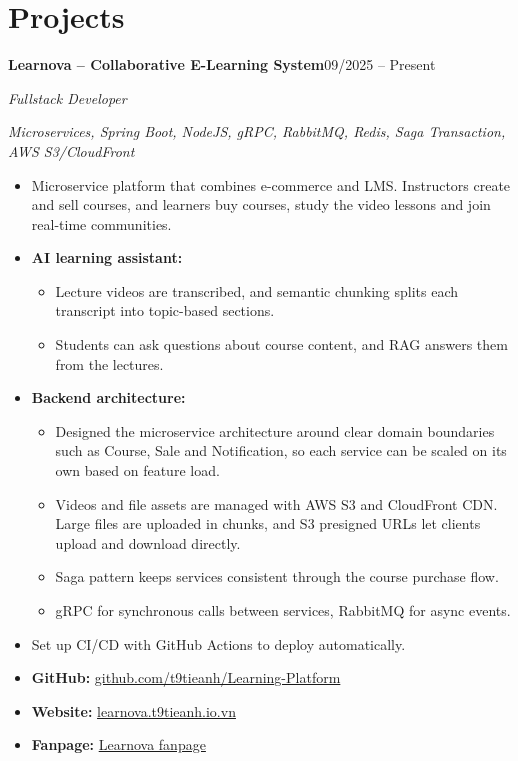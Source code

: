 \documentclass[11pt,a4paper]{article}
\newcommand{\entry}[3]{%
  \textbf{#1}\hfill #2\par\vspace{3pt}
  {\itshape\color{subtle}#3}\par\vspace{1pt}}
\begin{document}
\section{Projects}
\entry{Learnova -- Collaborative E-Learning System}{09/2025 -- Present}{Fullstack Developer}
{\small\textit{Microservices, Spring Boot, NodeJS, gRPC, RabbitMQ, Redis, Saga Transaction, AWS S3/CloudFront}}\par
\begin{itemize}
  \item Microservice platform that combines e-commerce and LMS. Instructors create and sell courses, and learners buy courses, study the video lessons and join real-time communities.
  \item \textbf{AI learning assistant:}
  \begin{itemize}
    \item Lecture videos are transcribed, and semantic chunking splits each transcript into topic-based sections.
    \item Students can ask questions about course content, and RAG answers them from the lectures.
  \end{itemize}
  \item \textbf{Backend architecture:}
  \begin{itemize}
    \item Designed the microservice architecture around clear domain boundaries such as Course, Sale and Notification, so each service can be scaled on its own based on feature load.
    \item Videos and file assets are managed with AWS S3 and CloudFront CDN. Large files are uploaded in chunks, and S3 presigned URLs let clients upload and download directly.
    \item Saga pattern keeps services consistent through the course purchase flow.
    \item gRPC for synchronous calls between services, RabbitMQ for async events.
  \end{itemize}
  \item Set up CI/CD with GitHub Actions to deploy automatically.
  \item \textbf{GitHub:} \href{https://github.com/t9tieanh/Learning-Platform}{github.com/t9tieanh/Learning-Platform}
  \item \textbf{Website:} \href{https://learnova.t9tieanh.io.vn/}{learnova.t9tieanh.io.vn}
  \item \textbf{Fanpage:} \href{https://www.facebook.com/profile.php?id=61569020296267}{Learnova fanpage}
\end{itemize}
\end{document}
